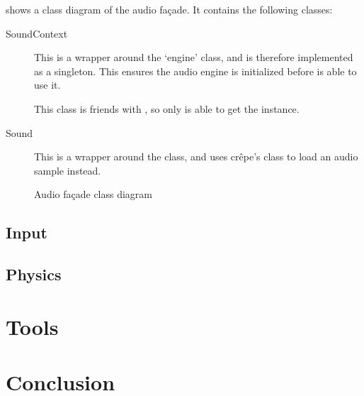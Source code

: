 \documentclass{projdoc}
\begin{document}
 shows a class diagram of the audio fa\c{c}ade. It
contains the following classes:
\begin{description}
	\item[SoundContext] This is a wrapper around the 
		`engine' class, and is therefore implemented as a singleton. This ensures the
		audio engine is initialized before  is able to use it.

		This class is friends with , so only  is able
		to get the  instance.
	\item[Sound] This is a wrapper around the  class, and uses
		cr\^epe's  class to load an audio sample instead.
\end{description}

\begin{figure}
	\centering
	\caption{Audio fa\c{c}ade class diagram}
	\label{fig:class-audio-facade}
\end{figure}

\subsection{Input}

\subsection{Physics}


\section{Tools}

\section{Conclusion}
\end{document}
